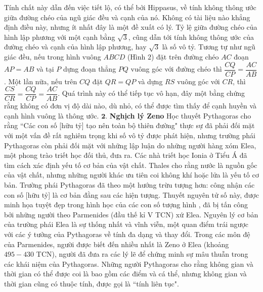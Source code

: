 \begin{multicols}{2}
	Tính chất này dẫn đến việc tiết lộ, có thể bởi Hippasus, về tính không thông ước giữa đường chéo của ngũ giác đều và cạnh của nó. Không có tài liệu nào khẳng định điều này, nhưng ít nhất đây là một đề xuất có lý.
	\vskip 0.1cm
	Tỷ lệ giữa đường chéo của hình lập phương với một cạnh bằng $\sqrt{3}$, cũng dẫn tới tính không thông ước của đường chéo và cạnh của hình lập phương, hay $\sqrt{3}$ là số vô tỷ.
	\vskip 0.1cm 
	Tương tự như ngũ giác đều, nếu trong hình vuông $ABCD$ (Hình $2$) đặt trên đường chéo $AC$ đoạn $AP = AB$  và tại $P$  dựng đoạn thẳng $PQ$  vuông góc với đường chéo thì $\dfrac{CQ}{CP} = \dfrac{AC}{AB}$. Một lần nữa, nếu trên $CQ$  đặt $QR = QP$ và  dựng $RS$  vuông góc với $CR$,  thì  $\dfrac{CS}{CR} = \dfrac{CQ}{CP} = \dfrac{AC}{AB}$. Quá trình này có thể tiếp tục vô hạn, đây một bằng chứng rằng không có đơn vị độ dài nào, dù nhỏ, có thể được tìm thấy để cạnh huyền và cạnh hình vuông là thông ước.
	\vskip 0.1cm
	\vskip 0.1cm
	$\pmb{2.}$ \textbf{Nghịch lý Zeno}
	\vskip 0.1cm
	Học thuyết Pythagoras cho rằng ``Các con số [hữu tỷ] tạo nên toàn bộ thiên đường" thực sự đã phải đối mặt với một vấn đề rất nghiêm trọng khi số vô tỷ được phát hiện, nhưng trường phái Pythagoras còn phải đối mặt với những lập luận do những người hàng xóm Elea, một phong trào triết học đối thủ, đưa ra. 
	\vskip 0.1cm
	Các nhà triết học Ionia ở Tiểu Á đã tìm cách xác định yếu tố cơ bản của vật chất.
	Thales cho rằng nước là nguồn gốc của vật chất, nhưng những người khác ưu tiên coi không khí hoặc lửa là yếu tố cơ bản. Trường phái Pythagoras đã theo một hướng trừu tượng hơn: công nhận các con số [hữu tỷ] là cơ bản đằng sau các hiện tượng. Thuyết nguyên tử số này, được minh họa tuyệt đẹp trong hình học của các con số tượng hình , đã bị tấn công bởi những người theo Parmenides (đầu thế kỉ V TCN) xứ Elea. Nguyên lý cơ bản của trường phái Elea là sự thống nhất và vĩnh viễn, một quan điểm trái ngược với các ý tưởng của Pythagoras về tính đa dạng và thay đổi.  Trong các môn đệ của Parmenides, người được biết đến nhiều nhất là Zeno ở Elea (khoảng $495-430$ TCN), người đã đưa ra các lý lẽ để chứng minh sự mâu thuẫn trong các khái niệm của Pythagoras.
	\vskip 0.1cm
	Những người Pythagoras cho rằng không gian và thời gian có thể được coi là bao gồm các điểm và cá thể, nhưng không gian và thời gian cũng có thuộc tính, được gọi là ``tính liên tục". 

\end{multicols}
